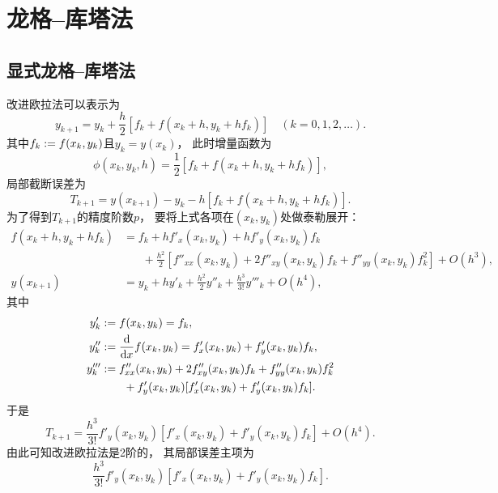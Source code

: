 \section{龙格--库塔法}
\subsection{显式龙格--库塔法}
改进欧拉法可以表示为\begin{equation*}
	y_{k+1}
	= y_k
	+ \frac{h}{2}
	[
		f_k
		+ f(x_k + h,y_k + h f_k)
	]
	\quad(k=0,1,2,\dotsc).
\end{equation*}
其中\(f_k := f(x_k,y_k)\)且\(y_k = y(x_k)\)，
此时增量函数为\begin{equation*}
	\phi(x_k,y_k,h)
	= \frac12 [
		f_k
		+ f(x_k + h,y_k + h f_k)
	],
\end{equation*}
局部截断误差为\begin{equation*}
	T_{k+1}
	= y(x_{k+1})
	- y_k
	- h [
		f_k
		+ f(x_k + h,y_k + h f_k)
	].
\end{equation*}
为了得到\(T_{k+1}\)的精度阶数\(p\)，
要将上式各项在\((x_k,y_k)\)处做泰勒展开：
\begin{align*}
	f(x_k + h,y_k + h f_k)
	&= f_k
	+ h f'_x(x_k,y_k)
	+ h f'_y(x_k,y_k) f_k \\
	&\hspace{20pt}
	+ \frac{h^2}{2} [
		f''_{xx}(x_k,y_k)
		+ 2 f''_{xy}(x_k,y_k) f_k
		+ f''_{yy}(x_k,y_k) f_k^2
	]
	+ O(h^3),
	\\
	y(x_{k+1})
	&= y_k
	+ h y'_k
	+ \frac{h^2}{2} y''_k
	+ \frac{h^3}{3!} y'''_k
	+ O(h^4),
\end{align*}
其中\begin{align*}
	y'_k
	&:=
	f(x_k,y_k)
	= f_k,
	\\
	y''_k
	&:=
	\dv{x} f(x_k,y_k)
	= f'_x(x_k,y_k)
	+ f'_y(x_k,y_k) f_k,
	\\
	y'''_k
	&:=
	f''_{xx}(x_k,y_k)
	+ 2 f''_{xy}(x_k,y_k) f_k
	+ f''_{yy}(x_k,y_k) f_k^2
	\\
	&\hspace{20pt}
	+ f'_y(x_k,y_k)
	[
		f'_x(x_k,y_k)
		+ f'_y(x_k,y_k) f_k
	].
\end{align*}
于是\begin{equation*}
	T_{k+1}
	= \frac{h^3}{3!}
	f'_y(x_k,y_k)
	[
		f'_x(x_k,y_k)
		+ f'_y(x_k,y_k) f_k
	]
	+ O(h^4).
\end{equation*}
由此可知改进欧拉法是2阶的，
其局部误差主项为\begin{equation*}
	\frac{h^3}{3!}
	f'_y(x_k,y_k)
	[
		f'_x(x_k,y_k)
		+ f'_y(x_k,y_k) f_k
	].
\end{equation*}

